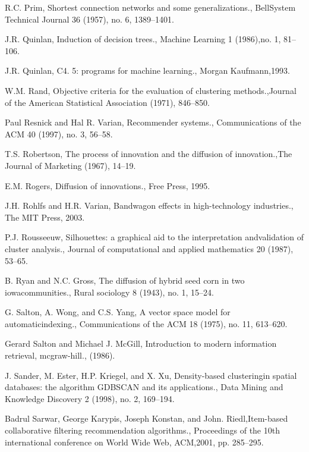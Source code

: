 \begin{thebibliography}{999}
 R.C. Prim, Shortest connection networks and some generalizations., BellSystem Technical Journal 36 (1957), no. 6, 1389–1401.

 J.R. Quinlan, Induction of decision trees., Machine Learning 1 (1986),no. 1, 81–106.

 J.R. Quinlan, C4. 5: programs for machine learning., Morgan Kaufmann,1993.

 W.M. Rand, Objective criteria for the evaluation of clustering methods.,Journal of the American Statistical Association (1971), 846–850.

 Paul Resnick and Hal R. Varian, Recommender systems., Communications of the ACM 40 (1997), no. 3, 56–58.

 T.S. Robertson, The process of innovation and the diffusion of innovation.,The Journal of Marketing (1967), 14–19.

 E.M. Rogers, Diffusion of innovations., Free Press, 1995.

 J.H. Rohlfs and H.R. Varian, Bandwagon effects in high-technology industries., The MIT Press, 2003.

 P.J. Rousseeuw, Silhouettes: a graphical aid to the interpretation andvalidation of cluster analysis., Journal of computational and applied mathematics 20 (1987), 53–65.

 B. Ryan and N.C. Gross, The diffusion of hybrid seed corn in two iowacommunities., Rural sociology 8 (1943), no. 1, 15–24.

 G. Salton, A. Wong, and C.S. Yang, A vector space model for automaticindexing., Communications of the ACM 18 (1975), no. 11, 613–620.

 Gerard Salton and Michael J. McGill, Introduction to modern information retrieval, mcgraw-hill., (1986).

 J. Sander, M. Ester, H.P. Kriegel, and X. Xu, Density-based clusteringin spatial databases: the algorithm GDBSCAN and its applications., Data Mining and Knowledge Discovery 2 (1998), no. 2, 169–194.

 Badrul Sarwar, George Karypis, Joseph Konstan, and John. Riedl,Item-based collaborative filtering recommendation algorithms., Proceedings of the 10th international conference on World Wide Web, ACM,2001, pp. 285–295.


\end{thebibliography}

